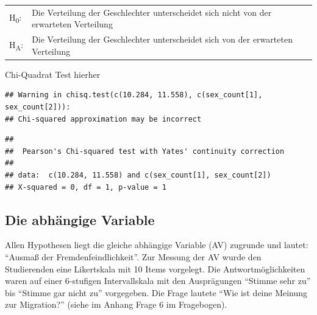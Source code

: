 \documentclass[]{article}
\newenvironment{Shaded}{\begin{snugshade}}{\end{snugshade}}
\newcommand{\KeywordTok}[1]{\textcolor[rgb]{0.13,0.29,0.53}{\textbf{{#1}}}}
\newcommand{\DecValTok}[1]{\textcolor[rgb]{0.00,0.00,0.81}{{#1}}}
\newcommand{\FloatTok}[1]{\textcolor[rgb]{0.00,0.00,0.81}{{#1}}}
\newcommand{\CommentTok}[1]{\textcolor[rgb]{0.56,0.35,0.01}{\textit{{#1}}}}
\newcommand{\NormalTok}[1]{{#1}}
\begin{document}
\begin{longtable}[]{@{}ll@{}}
\toprule
\begin{minipage}[t]{0.11\columnwidth}\raggedright\strut
H\textsubscript{0}:\strut
\end{minipage} & \begin{minipage}[t]{0.83\columnwidth}\raggedright\strut
Die Verteilung der Geschlechter unterscheidet sich nicht von der
erwarteten Verteilung\strut
\end{minipage}\tabularnewline
\begin{minipage}[t]{0.11\columnwidth}\raggedright\strut
H\textsubscript{A}:\strut
\end{minipage} & \begin{minipage}[t]{0.83\columnwidth}\raggedright\strut
Die Verteilung der Geschlechter unterscheidet sich von der erwarteten
Verteilung\strut
\end{minipage}\tabularnewline
\bottomrule
\end{longtable}

Chi-Quadrat Test hierher

\begin{Shaded}
\end{Shaded}

\begin{verbatim}
## Warning in chisq.test(c(10.284, 11.558), c(sex_count[1], sex_count[2])):
## Chi-squared approximation may be incorrect
\end{verbatim}

\begin{verbatim}
## 
##  Pearson's Chi-squared test with Yates' continuity correction
## 
## data:  c(10.284, 11.558) and c(sex_count[1], sex_count[2])
## X-squared = 0, df = 1, p-value = 1
\end{verbatim}

\subsection{Die abhängige Variable}\label{die-abhangige-variable}

Allen Hypothesen liegt die gleiche abhängige Variable (AV) zugrunde und
lautet: ``Ausmaß der Fremdenfeindlichkeit''. Zur Messung der AV wurde
den Studierenden eine Likertskala mit 10 Items vorgelegt. Die
Antwortmöglichkeiten waren auf einer 6-stufigen Intervallskala mit den
Ausprägungen ``Stimme sehr zu'' bis ``Stimme gar nicht zu'' vorgegeben.
Die Frage lautete ``Wie ist deine Meinung zur Migration?'' (siehe im
Anhang Frage 6 im Fragebogen).
\end{document}
